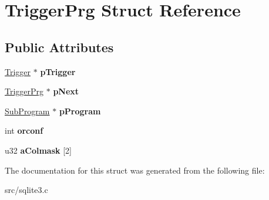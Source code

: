 \hypertarget{struct_trigger_prg}{\section{Trigger\-Prg Struct Reference}
\label{struct_trigger_prg}
}
\subsection*{Public Attributes}
\begin{DoxyCompactItemize}
\item 
\hypertarget{struct_trigger_prg_af70e5a74c954bc7a1eb8ee1162c40368}{\hyperlink{struct_trigger}{Trigger} $\ast$ {\bfseries p\-Trigger}}\label{struct_trigger_prg_af70e5a74c954bc7a1eb8ee1162c40368}

\item 
\hypertarget{struct_trigger_prg_a551b8a29a8c4ff785afab1596e5d8710}{\hyperlink{struct_trigger_prg}{Trigger\-Prg} $\ast$ {\bfseries p\-Next}}\label{struct_trigger_prg_a551b8a29a8c4ff785afab1596e5d8710}

\item 
\hypertarget{struct_trigger_prg_aa770aee270c7c5df85578dc4a6686134}{\hyperlink{struct_sub_program}{Sub\-Program} $\ast$ {\bfseries p\-Program}}\label{struct_trigger_prg_aa770aee270c7c5df85578dc4a6686134}

\item 
\hypertarget{struct_trigger_prg_aa475acda58c472b3491f6aa17020bf68}{int {\bfseries orconf}}\label{struct_trigger_prg_aa475acda58c472b3491f6aa17020bf68}

\item 
\hypertarget{struct_trigger_prg_aeac0a4cd1f1d287981ae33c4d171b614}{u32 {\bfseries a\-Colmask} \mbox{[}2\mbox{]}}\label{struct_trigger_prg_aeac0a4cd1f1d287981ae33c4d171b614}

\end{DoxyCompactItemize}


The documentation for this struct was generated from the following file\-:\begin{DoxyCompactItemize}
\item 
src/sqlite3.\-c\end{DoxyCompactItemize}

